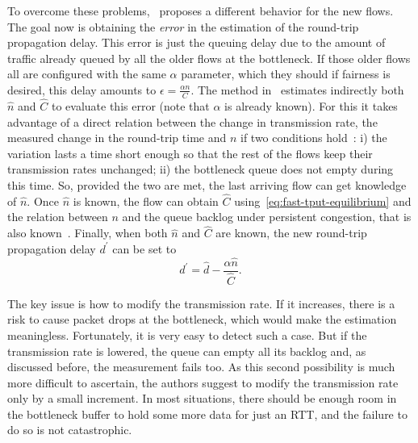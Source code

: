 \documentclass[english,times]{ettauth}
\begin{document}
To overcome these problems,~\cite{Rperez08b} proposes a different behavior for
the new flows. The goal now is obtaining the \emph{error} in the estimation of
the round-trip propagation delay. This error is just the queuing delay due to
the amount of traffic already queued by all the older flows at the bottleneck.
If those older flows all are configured with the same $\alpha$ parameter,
which they should if fairness is desired, this delay amounts to $\epsilon =
\frac{\alpha n}{C}$. The method in~\cite{Rperez08b} estimates indirectly both
$\hat n$ and $\hat C$ to evaluate this error (note that $\alpha$ is already
known). For this it takes advantage of a direct relation between the change in
transmission rate, the measured change in the round-trip time and $n$ if two
conditions hold~\cite{Rperez10}: i) the variation lasts a time short enough so
that the rest of the flows keep their transmission rates unchanged; ii) the
bottleneck queue does not empty during this time. So, provided the two are
met, the last arriving flow can get knowledge of $\hat n$. Once $\hat n$ is
known, the flow can obtain $\hat C$ using~\eqref{eq:fast-tput-equilibrium} and
the relation between $n$ and the queue backlog under persistent congestion,
that is also known~\cite{Rperez10}. Finally, when both $\hat n$ and $\hat C$
are known, the new round-trip propagation delay $d^\prime$ can be set to
\begin{equation}
  \label{eq:error-d}
  d^\prime = \hat d - \frac{\alpha \hat n}{\hat C}.
\end{equation}

The key issue is how to modify the transmission rate. If it increases, there
is a risk to cause packet drops at the bottleneck, which would make the
estimation meaningless. Fortunately, it is very easy to detect such a case.
But if the transmission rate is lowered, the queue can empty all its backlog
and, as discussed before, the measurement fails too. As this second
possibility is much more difficult to ascertain, the authors suggest to modify
the transmission rate only by a small increment. In most situations, there
should be enough room in the bottleneck buffer to hold some more data for just
an RTT, and the failure to do so is not catastrophic.
\end{document}
